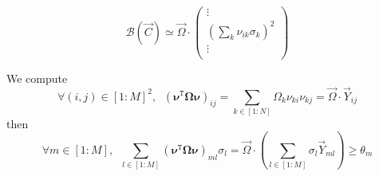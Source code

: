 \documentclass[aps,12pt]{revtex4}
\newcommand{\trn}[1]{{#1}^{\mathtt{T}}}
\begin{document}
\begin{equation}
	\mathcal{B}(\vec{C}) \simeq \vec{\Omega} \cdot
	\begin{pmatrix}
		\vdots\\
		(\sum_k \nu_{ik} \sigma_k)^2\\
		\vdots\\
	\end{pmatrix}
\end{equation}

We compute
\begin{equation}
	\forall (i,j) \in  [1:M]^2, \;\; (\trn{\bm{\nu}} \bm{\Omega} \bm{\nu} )_{ij} = \sum_{k\in[1:N]} \Omega_k \nu_{ki}\nu_{kj} = \vec{\Omega} \cdot \vec{Y}_{ij}
\end{equation}
then
\begin{equation}
	\forall m \in [1:M], \;\; \sum_{l\in[1:M]} (\trn{\bm{\nu}} \bm{\Omega} \bm{\nu} )_{ml} \sigma_l 
	= \vec{\Omega} \cdot \left( \sum_{l\in[1:M]}\sigma_l \vec{Y}_{ml} \right) \geq \theta_m
\end{equation}
\end{document}
